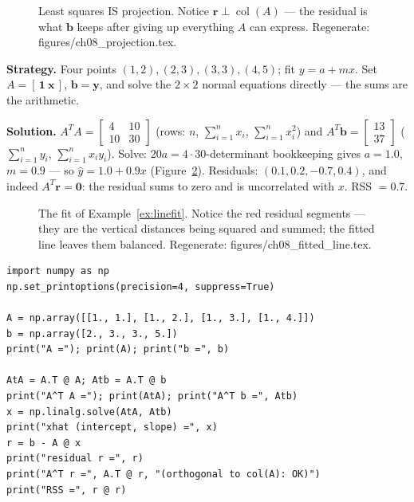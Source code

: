 \begin{figure}[htbp]
\centering

\caption{Least squares IS projection. Notice $\mathbf r\perp
\operatorname{col}(A)$ --- the residual is what $\mathbf b$ keeps after
giving up everything $A$ can express. Regenerate:
\ttfamily figures/ch08\_projection.tex.}
\label{fig:lsq-proj}
\end{figure}

\begin{example}\label{ex:linefit}
\textbf{Strategy.} Four points $(1,2),(2,3),(3,3),(4,5)$; fit
$y=a+mx$. Set $A=[\,\mathbf1\ \mathbf x\,]$, $\mathbf b=\mathbf y$, and
solve the $2\times2$ normal equations directly --- the sums are the
arithmetic.

\textbf{Solution.}
$A^{T}A=\begin{bmatrix}4&10\\10&30\end{bmatrix}$ (rows: $n$, $\sum_{i=1}^{n}x_i$,
$\sum_{i=1}^{n}x_i^{2}$) and $A^{T}\mathbf b=\begin{bmatrix}13\\37\end{bmatrix}$
($\sum_{i=1}^{n}y_i$, $\sum_{i=1}^{n}x_iy_i$). Solve:
$20a=4\cdot30$-determinant bookkeeping gives $a=1.0$, $m=0.9$ --- so
$\hat y=1.0+0.9x$ (Figure~\ref{fig:linefit}). Residuals:
$(0.1,0.2,-0.7,0.4)$, and indeed $A^{T}\mathbf r=\mathbf0$: the residual
sums to zero and is uncorrelated with $x$. RSS $=0.7$.
\end{example}

\begin{figure}[htbp]
\centering

\caption{The fit of Example~\ref{ex:linefit}. Notice the red residual
segments --- they are the vertical distances being squared and summed;
the fitted line leaves them balanced.
Regenerate: \ttfamily figures/ch08\_fitted\_line.tex.}
\label{fig:linefit}
\end{figure}

\begin{lstlisting}[caption={\ttfamily code/ch08\_normal\_eq.py --- the
normal equations assembled and solved exactly as worked by hand.}]
import numpy as np
np.set_printoptions(precision=4, suppress=True)

A = np.array([[1., 1.], [1., 2.], [1., 3.], [1., 4.]])
b = np.array([2., 3., 3., 5.])
print("A ="); print(A); print("b =", b)

AtA = A.T @ A; Atb = A.T @ b
print("A^T A ="); print(AtA); print("A^T b =", Atb)
x = np.linalg.solve(AtA, Atb)
print("xhat (intercept, slope) =", x)
r = b - A @ x
print("residual r =", r)
print("A^T r =", A.T @ r, "(orthogonal to col(A): OK)")
print("RSS =", r @ r)
\end{lstlisting}

